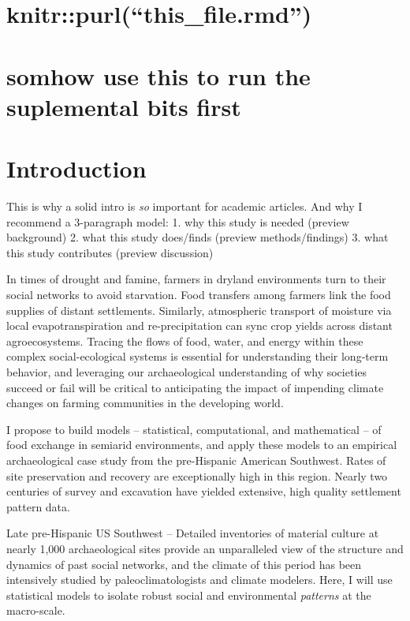 \documentclass[10pt,letterpaper]{article}
\begin{document}
\linenumbers

\section{\texorpdfstring{knitr::purl(``this\_file.rmd'')}{knitr::purl(this\_file.rmd)}}\label{knitrpurlthis_file.rmd}

\section{somhow use this to run the suplemental bits
first}\label{somhow-use-this-to-run-the-suplemental-bits-first}

\section{Introduction}\label{introduction}

This is why a solid intro is \emph{so} important for academic articles.
And why I recommend a 3-paragraph model: 1. why this study is needed
(preview background) 2. what this study does/finds (preview
methods/findings) 3. what this study contributes (preview discussion)

In times of drought and famine, farmers in dryland environments turn to
their social networks to avoid starvation. Food transfers among farmers
link the food supplies of distant settlements. Similarly, atmospheric
transport of moisture via local evapotranspiration and re-precipitation
can sync crop yields across distant agroecosystems. Tracing the flows of
food, water, and energy within these complex social-ecological systems
is essential for understanding their long-term behavior, and leveraging
our archaeological understanding of why societies succeed or fail will
be critical to anticipating the impact of impending climate changes on
farming communities in the developing world.

I propose to build models -- statistical, computational, and
mathematical -- of food exchange in semiarid environments, and apply
these models to an empirical archaeological case study from the
pre-Hispanic American Southwest. Rates of site preservation and recovery
are exceptionally high in this region. Nearly two centuries of survey
and excavation have yielded extensive, high quality settlement pattern
data.

Late pre-Hispanic US Southwest -- Detailed inventories of material
culture at nearly 1,000 archaeological sites provide an unparalleled
view of the structure and dynamics of past social networks, and the
climate of this period has been intensively studied by
paleoclimatologists and climate modelers. Here, I will use statistical
models to isolate robust social and environmental \emph{patterns} at the
macro-scale.
\end{document}
